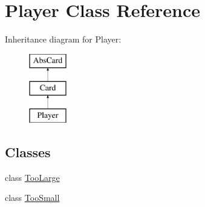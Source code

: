\hypertarget{class_player}{}\section{Player Class Reference}
\label{class_player}
Inheritance diagram for Player\+:\begin{figure}[H]
\begin{center}
\leavevmode
\includegraphics[height=3.000000cm]{class_player}
\end{center}
\end{figure}
\subsection*{Classes}
\begin{DoxyCompactItemize}
\item 
class \hyperlink{class_player_1_1_too_large}{Too\+Large}
\item 
class \hyperlink{class_player_1_1_too_small}{Too\+Small}
\end{DoxyCompactItemize}
